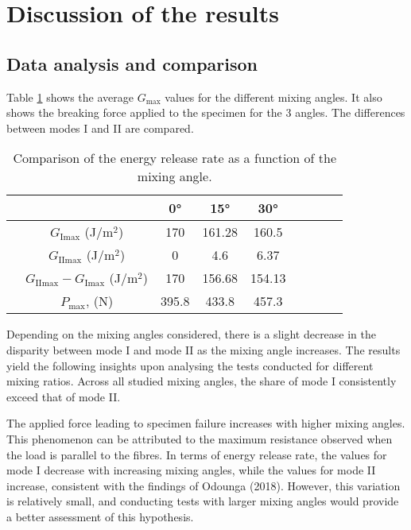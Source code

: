 \section{Discussion of the results}

\subsection{Data analysis and comparison}

Table \ref{fig:Comparison_angle} shows the average $G_\text{max}$ values for the different mixing angles. It also shows the breaking force applied to the specimen for the 3 angles. The differences between modes I and II are compared.

\begin{table} [H]
	\centering
	\begin{tabular}{ccccccccc}
		\toprule %
		&  & 0° & 15° & 30° \\\midrule
		& $G_\text{Imax}$ (J/m$^2$)  & 170 & 161.28 & 160.5  \\
		& $G_\text{IImax}$ (J/m$^2$) & 0 & 4.6 & 6.37 \\
		& $G_\text{IImax} - G_\text{Imax}$ (J/m$^2$) & 170 & 156.68 & 154.13 \\
		& $P_\text{max}$, (N) & 395.8 & 433.8 & 457.3 \\\bottomrule
	\end{tabular}
	\caption{Comparison of the energy release rate as a function of the mixing angle.}
	\label{fig:Comparison_angle}
\end{table}

Depending on the mixing angles considered, there is a slight decrease in the disparity between mode I and mode II as the mixing angle increases. The results yield the following insights upon analysing the tests conducted for different mixing ratios. Across all studied mixing angles, the share of mode I consistently exceed that of mode II.

The applied force leading to specimen failure increases with higher mixing angles. This phenomenon can be attributed to the maximum resistance observed when the load is parallel to the fibres.
In terms of energy release rate, the values for mode I decrease with increasing mixing angles, while the values for mode II increase, consistent with the findings of Odounga (2018). However, this variation is relatively small, and conducting tests with larger mixing angles would provide a better assessment of this hypothesis.

